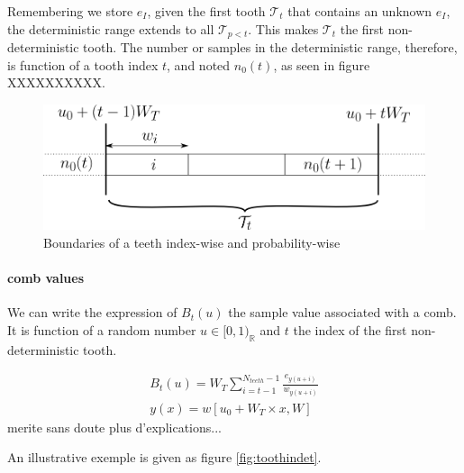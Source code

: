 \documentclass[./thesis.tex]{subfiles}
\begin{document}
Remembering we store $e_I$, given the first tooth $\mathcal{T}_t$ that contains an unknown $e_I$, the deterministic range extends to all $\mathcal{T}_{p<t}$. This makes $\mathcal{T}_t$ the first non-deterministic tooth.
The number or samples in the deterministic range, therefore, is function of a tooth index $t$, and noted $n_0(t)$, as seen in figure \alert{XXXXXXXXXX}.

\begin{figure}[h!]
	\begin{center}
		\includegraphics[width=0.9\columnwidth]{figures/pt2/tooththreshold}
	\end{center}
	\caption{Boundaries of a teeth index-wise and probability-wise}
	\label{fig:boundaries_teeth}
\end{figure}


\paragraph{comb values}

We can write the expression of $B_t(u)$ the sample value associated with a comb. It is function of a random number $u \in [0,1)_\mathbb{R}$ and $t$ the index of the first non-deterministic tooth.

\begin{align}
\label{eq:combvalue}
B_t(u) = W_T \sum_{i=t-1}^{N_{teeth}-1} \frac{e_{y(u+i)}}{w_{y(u+i)}} \\
y(x)=w[u_0+ W_T \times x, W]
\end{align}
\alert{merite sans doute plus d'explications...}

An illustrative exemple is given as figure \ref{fig:toothindet}.
\end{document}
